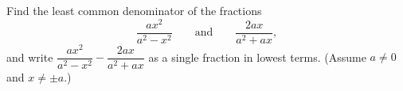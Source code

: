 Find the least common denominator of the fractions
\[
\dfrac{ax^2}{a^2-x^2}\qquad\text{and}\qquad\dfrac{2ax}{a^2+ax},
\]
and write $\dfrac{ax^2}{a^2-x^2}-\dfrac{2ax}{a^2+ax}$ as a single fraction in lowest terms. (Assume $a\ne0$ and $x\ne\pm a$.)
